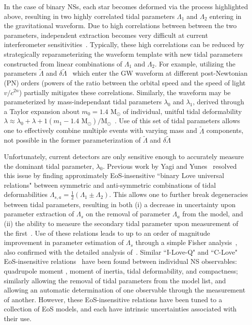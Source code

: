\documentclass[prd,twocolumn,nofootinbib,superscriptaddress,amsmath,amssymb]{revtex4-1}
\begin{document}
In the case of binary NSs, each star becomes deformed via the process highlighted above, resulting in two highly correlated tidal parameters $\Lambda_1$ and $\Lambda_2$ entering in the gravitational waveform\cite{Flanagan2008,Vines:2011ud}.
Due to high correlations between between the two parameters, independent extraction becomes very difficult at current interferometer sensitivities~\cite{Wade:tidalCorrections}.
Typically, these high correlations can be reduced by strategically reparameterizing the waveform template with new tidal parameters constructed from linear combinations of $\Lambda_1$ and $\Lambda_2$.
For example, utilizing the parameters $\tilde{\Lambda}$ and $\delta \tilde{\Lambda}$~\cite{Favata:2013rwa,Wade:tidalCorrections} which enter the GW waveform at different post-Newtonian (PN) orders (powers of the ratio between the orbital speed and the speed of light $v/c^{2n}$) partially mitigates these correlations.
Similarly, the waveform may be parameterized by mass-independant tidal parameters $\lambda_0$ and $\lambda_1$, derived through a Taylor expansion about $m_0=1.4 \text{ M}_{\odot}$ of individual, unitful tidal deformability $\lambda \approx \lambda_0+\lambda+1(m_1-1.4 \text{ M}_{\odot})/\text{M}_{\odot}$~\cite{delPozzo:TaylorTidal}. 
Use of this set of tidal parameters allows one to effectively combine multiple events with varying mass and $\tilde\Lambda$ components, not possible in the former parameterization of $\tilde{\Lambda}$ and $\delta \tilde{\Lambda}$

Unfortunately, current detectors are only sensitive enough to accurately measure the dominant tidal parameter, $\lambda_0$.
Previous work by Yagi and Yunes~\cite{Yagi:binLove} resolved this issue by finding approximately EoS-insensitive ``binary Love universal relations" between symmetric and anti-symmetric combinations of tidal deformabilities $\Lambda_{s,a}=\frac{1}{2}(\Lambda_1 \pm \Lambda_2)$.
This allows one to further break degeneracies between tidal parameters, resulting in both (i) a decrease in uncertainty upon parameter extraction of $\Lambda_s$ on the removal of parameter $\Lambda_a$ from the model, and (ii) the ability to measure the secondary tidal parameter upon measurement of the first~\cite{Katerina:residuals}.  
Use of these relations leads to up to an order of magnitude improvement in parameter estimation of $\Lambda_s$ through a simple Fisher analysis~\cite{Yagi:binLove}, also confirmed with the detailed analysis of~\cite{Katerina:residuals}.
Similar ``I-Love-Q" and ``C-Love" EoS-insensitive relations~\cite{Yagi:ILQ} have been found between individual NS observables: quadrupole moment , moment of inertia, tidal deformability, and compactness; similarly allowing the removal of tidal parameters from the model list, and allowing an automatic determination of one observable through the measurement of another.
However, these EoS-insensitive relations have been tuned to a collection of EoS models, and each have intrinsic uncertainties associated with their use.
\end{document}
